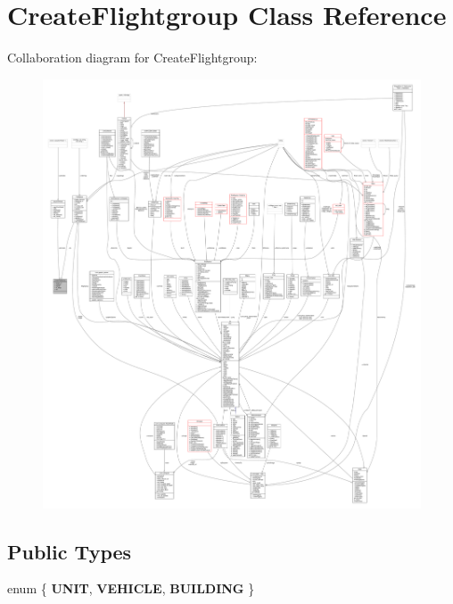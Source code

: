 \hypertarget{classCreateFlightgroup}{}\section{Create\+Flightgroup Class Reference}
\label{classCreateFlightgroup}


Collaboration diagram for Create\+Flightgroup\+:
\nopagebreak
\begin{figure}[H]
\begin{center}
\leavevmode
\includegraphics[width=350pt]{d5/dee/classCreateFlightgroup__coll__graph}
\end{center}
\end{figure}
\subsection*{Public Types}
\begin{DoxyCompactItemize}
\item 
enum \{ {\bfseries U\+N\+IT}, 
{\bfseries V\+E\+H\+I\+C\+LE}, 
{\bfseries B\+U\+I\+L\+D\+I\+NG}
 \}\hypertarget{classCreateFlightgroup_a442cff3b6456ddf9bf38f1599b9b6b50}{}\label{classCreateFlightgroup_a442cff3b6456ddf9bf38f1599b9b6b50}

\end{DoxyCompactItemize}
